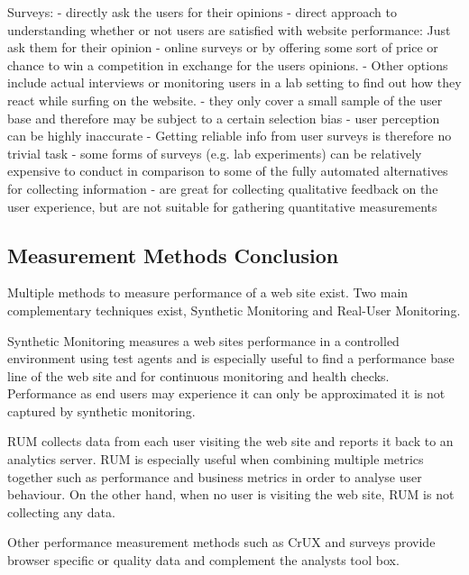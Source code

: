 Surveys:
- directly ask the users for their opinions
- direct approach to understanding whether or not users are satisfied with website performance: Just ask them for their opinion
- online surveys or by offering some sort of price or chance to win a competition in exchange for the users opinions. 
- Other options include actual interviews or monitoring users in a lab setting to find out how they react while surfing on the website.
- they only cover a small sample of the user base and therefore may be subject to a certain selection bias
- user perception can be highly inaccurate
- Getting reliable info from user surveys is therefore no trivial task
- some forms of surveys (e.g. lab experiments) can be relatively expensive to conduct in comparison to some of the fully automated alternatives for collecting information
- are great for collecting qualitative feedback on the user experience, but are not suitable for gathering quantitative measurements







\subsection{Measurement Methods Conclusion}


Multiple methods to measure performance of a web site exist.
Two main complementary techniques exist, Synthetic Monitoring and Real-User Monitoring.

Synthetic Monitoring measures a web sites performance in a controlled environment using test agents and is especially useful to find a performance base line of the web site and for continuous monitoring and health checks.
Performance as end users may experience it can only be approximated it is not captured by synthetic monitoring.

RUM collects data from each user visiting the web site and reports it back to an analytics server.
RUM is especially useful when combining multiple metrics together such as performance and business metrics in order to analyse user behaviour.
On the other hand, when no user is visiting the web site, RUM is not collecting any data.

Other performance measurement methods such as CrUX and surveys provide browser specific or quality data and complement the analysts tool box.




